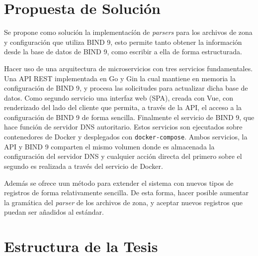
\section{Propuesta de Solución}

Se propone como solución la implementacíón de \textit{parsers} para los archivos de zona y configuración que utiliza BIND 9, esto permite tanto obtener la información desde la base de datos de BIND 9, como escribir a ella de forma estructurada.

Hacer uso de una arquitectura de microservicios con tres servicios fundamentales. Una API REST implementada en Go y Gin la cual mantiene en memoria la configuración de BIND 9,  y procesa las solicitudes para actualizar dicha base de datos. Como segundo servicio una interfaz web (SPA), creada con Vue, con renderizado del lado del cliente que permita, a través de la API, el acceso a la configuración de BIND 9 de forma sencilla. Finalmente el servicio de BIND 9, que hace función de servidor DNS autoritario. Estos servicios son ejecutados sobre contenedores de Docker y desplegados con \verb+docker-compose+. Ambos servicios, la API y BIND 9 comparten el mismo volumen donde es almacenada la configuración del servidor DNS y cualquier acción directa del primero sobre el segundo es realizada a través del servicio de Docker.

Además se ofrece uun método para extender el sistema con nuevos tipos de registros de forma relativamente sencilla. De esta forma, hacer posible aumentar la gramática del \textit{parser} de los archivos de zona, y aceptar nuevos registros que puedan ser añadidos al estándar.

\section{Estructura de la Tesis}

